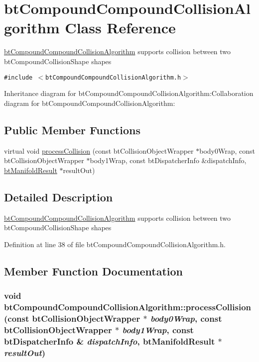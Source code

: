 \hypertarget{classbt_compound_compound_collision_algorithm}{
\section{btCompoundCompoundCollisionAlgorithm Class Reference}
\label{classbt_compound_compound_collision_algorithm}
}
\hyperlink{classbt_compound_compound_collision_algorithm}{btCompoundCompoundCollisionAlgorithm} supports collision between two btCompoundCollisionShape shapes  


{\tt \#include $<$btCompoundCompoundCollisionAlgorithm.h$>$}

Inheritance diagram for btCompoundCompoundCollisionAlgorithm:Collaboration diagram for btCompoundCompoundCollisionAlgorithm:\subsection*{Public Member Functions}
\begin{CompactItemize}
\item 
virtual void \hyperlink{classbt_compound_compound_collision_algorithm_5fb9d60f9713c0e3795c89390353beb3}{processCollision} (const btCollisionObjectWrapper $\ast$body0Wrap, const btCollisionObjectWrapper $\ast$body1Wrap, const btDispatcherInfo \&dispatchInfo, \hyperlink{classbt_manifold_result}{btManifoldResult} $\ast$resultOut)
\end{CompactItemize}


\subsection{Detailed Description}
\hyperlink{classbt_compound_compound_collision_algorithm}{btCompoundCompoundCollisionAlgorithm} supports collision between two btCompoundCollisionShape shapes 

Definition at line 38 of file btCompoundCompoundCollisionAlgorithm.h.

\subsection{Member Function Documentation}
\hypertarget{classbt_compound_compound_collision_algorithm_5fb9d60f9713c0e3795c89390353beb3}{
\subsubsection[processCollision]{\setlength{\rightskip}{0pt plus 5cm}void btCompoundCompoundCollisionAlgorithm::processCollision (const btCollisionObjectWrapper $\ast$ {\em body0Wrap}, \/  const btCollisionObjectWrapper $\ast$ {\em body1Wrap}, \/  const btDispatcherInfo \& {\em dispatchInfo}, \/  {\bf btManifoldResult} $\ast$ {\em resultOut})}}
\label{classbt_compound_compound_collision_algorithm_5fb9d60f9713c0e3795c89390353beb3}





